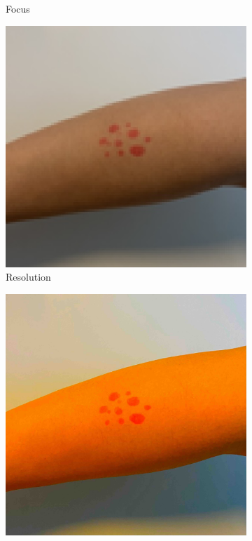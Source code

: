 \begin{figure}[ht]
\begin{subfigure}[b]{0.24\textwidth}
        \caption{Focus}
        \label{fig:focus}
    \end{subfigure}
    \hfill
    \begin{subfigure}[b]{0.24\textwidth}
        \includegraphics[width=\textwidth]{img/Resolution.jpg}
        \caption{Resolution}
        \label{fig:resol}
    \end{subfigure}
    \hfill
    \begin{subfigure}[b]{0.24\textwidth}
        \includegraphics[width=\textwidth]{img/Color.jpg}

\end{subfigure}
\end{figure}
